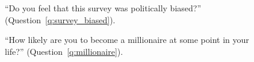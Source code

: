 \begin{figure}[h!]
    \caption[Feeling that the survey was politically biased]{``Do you feel that this survey was politically biased?'' (Question~\ref{q:survey_biased}).
    }\label{fig:survey_biased}
\end{figure}


\begin{figure}[h!]
    \caption[Likelihood of becoming a millionaire]{``How likely are you to become a millionaire at some point in your life?'' (Question~\ref{q:millionaire}).
    }\label{fig:millionaire}
\end{figure}

